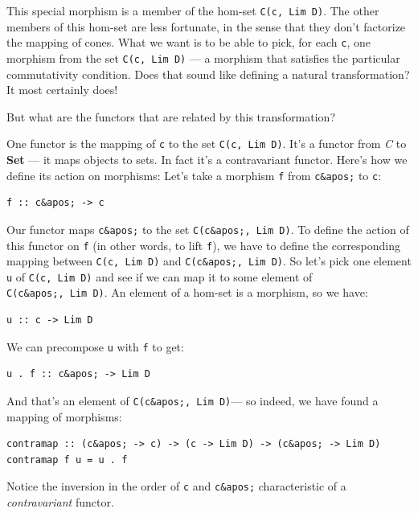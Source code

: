 This special morphism is a member of the hom-set \texttt{C(c,\ Lim\ D)}.
The other members of this hom-set are less fortunate, in the sense that
they don't factorize the mapping of cones. What we want is to be able to
pick, for each \texttt{c}, one morphism from the set
\texttt{C(c,\ Lim\ D)} --- a morphism that satisfies the particular
commutativity condition. Does that sound like defining a natural
transformation? It most certainly does!

But what are the functors that are related by this transformation?

One functor is the mapping of \texttt{c} to the set
\texttt{C(c,\ Lim\ D)}. It's a functor from \emph{C} to \textbf{Set} ---
it maps objects to sets. In fact it's a contravariant functor. Here's
how we define its action on morphisms: Let's take a morphism \texttt{f}
from \texttt{c\&apos;} to \texttt{c}:

\begin{verbatim}
f :: c&apos; -> c
\end{verbatim}

Our functor maps \texttt{c\&apos;} to the set
\texttt{C(c\&apos;,\ Lim\ D)}. To define the action of this functor on
\texttt{f} (in other words, to lift \texttt{f}), we have to define the
corresponding mapping between \texttt{C(c,\ Lim\ D)} and
\texttt{C(c\&apos;,\ Lim\ D)}. So let's pick one element \texttt{u} of
\texttt{C(c,\ Lim\ D)} and see if we can map it to some element of
\texttt{C(c\&apos;,\ Lim\ D)}. An element of a hom-set is a morphism, so
we have:

\begin{verbatim}
u :: c -> Lim D
\end{verbatim}

We can precompose \texttt{u} with \texttt{f} to get:

\begin{verbatim}
u . f :: c&apos; -> Lim D
\end{verbatim}

And that's an element of \texttt{C(c\&apos;,\ Lim\ D)}--- so indeed, we
have found a mapping of morphisms:

\begin{verbatim}
contramap :: (c&apos; -> c) -> (c -> Lim D) -> (c&apos; -> Lim D) contramap f u = u . f
\end{verbatim}

Notice the inversion in the order of \texttt{c} and \texttt{c\&apos;}
characteristic of a \emph{contravariant} functor.

